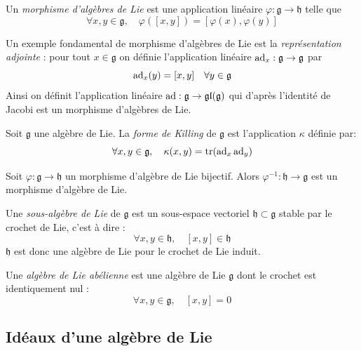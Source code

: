 \begin{definition}
    Un \emph{morphisme d'algèbres de Lie} est une application linéaire $\varphi: \mathfrak{g} \to \mathfrak{h}$ telle que 
    $$\forall x, y \in \mathfrak{g}, \quad \varphi([x,y]) = [\varphi(x), \varphi(y)]$$
\end{definition}

Un exemple fondamental de morphisme d'algèbres de Lie est la \emph{représentation adjointe} : pour tout $x\in \mathfrak{g}$ on définie l'application linéaire $\operatorname{ad}_x : \mathfrak{g} \to \mathfrak{g}$ par 
$$\operatorname{ad}_x(y) = [x, y] \quad \forall y \in \mathfrak{g}$$
Ainsi on définit l'application linéaire $\operatorname{ad} : \mathfrak{g} \to \mathfrak{gl}(\mathfrak{g})$ qui d'après l'identité de Jacobi est un morphisme d'algèbres de Lie.

\begin{definition}
    Soit $\mathfrak{g}$ une algèbre de Lie. La \emph{forme de Killing} de $\mathfrak{g}$ est l'application $\kappa$ définie par:
    $$\forall x, y\in \mathfrak{g}, \quad \kappa(x,y) = \operatorname{tr}(\operatorname{ad}_x \operatorname{ad}_y)$$
\end{definition}

\begin{proposition}
    Soit $\varphi : \mathfrak{g} \to \mathfrak{h}$ un morphisme d'algèbre de Lie bijectif. Alors $\varphi^{-1} : \mathfrak{h} \to \mathfrak{g}$ est un morphisme d'algèbre de Lie. 
\end{proposition}

\omitted

\begin{definition}
    Une \emph{sous-algèbre de Lie} de $\mathfrak{g}$ est un sous-espace vectoriel $\mathfrak{h} \subset \mathfrak{g}$ stable par le crochet de Lie, c'est à dire :
    $$\forall x, y \in \mathfrak{h}, \quad [x,y] \in \mathfrak{h}$$ $\mathfrak{h}$ est donc une algèbre de Lie pour le crochet de Lie induit.
\end{definition}

\begin{definition}
    Une \emph{algèbre de Lie abélienne} est une algèbre de Lie $\mathfrak{g}$ dont le crochet est identiquement nul :
    $$\forall x, y \in \mathfrak{g}, \quad [x, y] = 0$$
\end{definition}

\subsection{Idéaux d'une algèbre de Lie}


